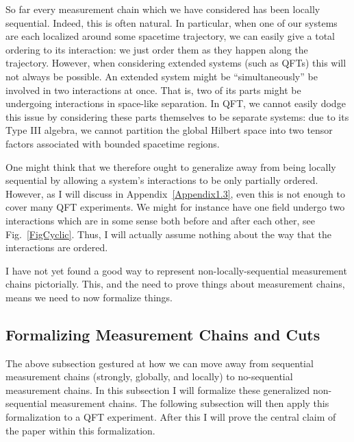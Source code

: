 \documentclass[prd,twocolumn,superscriptaddress,floatfix,amsmath,amssymb,amsfonts,nofootinbib]{revtex4-2}
\begin{document}

So far every measurement chain which we have considered has been locally sequential. Indeed, this is often natural. In particular, when one of our systems are each localized around some spacetime trajectory, we can easily give a total ordering to its interaction: we just order them as they happen along the trajectory. However, when considering extended systems (such as QFTs) this will not always be possible. An extended system might be ``simultaneously'' be involved in two interactions at once. That is, two of its parts might be undergoing interactions in space-like separation. In QFT, we cannot easily dodge this issue by considering these parts themselves to be separate systems: due to its Type III algebra, we cannot partition the global Hilbert space into two tensor factors associated with bounded spacetime regions. 

One might think that we therefore ought to generalize away from being locally sequential by allowing a system's interactions to be only partially ordered. However, as I will discuss in Appendix~\ref{Appendix1.3}, even this is not enough to cover many QFT experiments. We might for instance have one field undergo two interactions which are in some sense both before and after each other, see Fig.~\ref{FigCyclic}. Thus, I will actually assume nothing about the way that the interactions are ordered.

I have not yet found a good way to represent non-locally-sequential measurement chains pictorially. This, and the need to prove things about measurement chains, means we need to now formalize things.

\subsection{Formalizing Measurement Chains and Cuts}
The above subsection gestured at how we can move away from sequential measurement chains (strongly, globally, and locally) to no-sequential measurement chains. In this subsection I will formalize these generalized non-sequential measurement chains. The following subsection will then apply this formalization to a QFT experiment. After this I will prove the central claim of the paper within this formalization.
\end{document}
